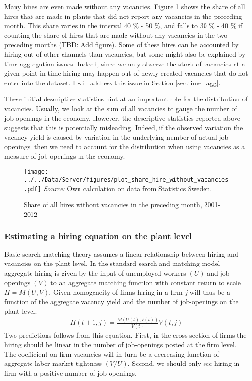 Many hires are even made without any vacancies. Figure \ref{fig:share_without} shows the share of all hires that are made in plants that did not report any vacancies in the preceding month. This share varies in the interval 40 \% - 50 \%, and falls to 30 \% - 40 \% if counting the share of hires that are made without any vacancies in the two preceding months (TBD: Add figure). Some of these hires can be accounted by hiring out of other channels than vacancies, but some might also be explained by time-aggregation issues. Indeed, since we only observe the stock of vacancies at a given point in time hiring may happen out of newly created vacancies that do not enter into the dataset. I will address this issue in Section \ref{sec:time_agg}.

These initial descriptive statistics hint at an important role for the distribution of vacancies. Usually, we look at the sum of all vacancies to gauge the number of job-openings in the economy. However, the descriptive statistics reported above suggests that this is potentially misleading. Indeed, if the observed variation the vacancy yield is caused by variation in the underlying number of actual job-openings, then we need to account for the distribution when using vacancies as a measure of job-openings in the economy. 

\begin{figure}[t]
\centering
\caption{Share of all hires without vacancies in the preceding month, 2001-2012}
\texttt{[image: ../../Data/Server/figures/plot\_share\_hire\_without\_vacancies.pdf]}
\flushleft
\footnotesize{\emph{Source:} Own calculation on data from Statistics Sweden.}
\label{fig:share_without}
\end{figure}

\subsubsection{Estimating a hiring equation on the plant level}

Basic search-matching theory assumes a linear relationship between hiring and vacancies on the plant level. In the standard search and matching model aggregate hiring is given by the input of unemployed workers $(U)$ and job-openings $(V)$ to an aggregate matching function with constant return to scale $H=M(U,V)$. Given  homogeneity of firms hiring in a firm $j$ will thus be a function of the aggregate vacancy yield and the number of job-openings on the plant level.
\begin{align}
H(t+1, j)=\frac{M(U(t),V(t))}{V(t)} V(t,j)
\label{eq:ht+1}
\end{align}
Two predictions follows from this equation. First, in the cross-section of firms the hiring should be linear in the number of job-openings posted at the firm level. The coefficient on firm vacancies will in turn be a decreasing function of aggregate labor market tightness $(V/U)$. Second, we should only see hiring in firm with a positive number of job-openings. 

